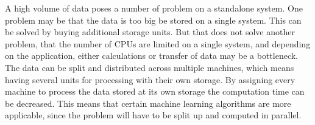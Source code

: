 A high volume of data poses a number of problem on a standalone system. One problem may be that the data is too big be stored on a single system.
This can be solved by buying additional storage units. But that does not solve another problem, that the number of CPUs are limited on a single system, and depending on the application, either calculations or transfer of data may be a bottleneck.
The data can be split and distributed across multiple machines, which means having several units for processing with their own storage. By assigning every machine to process the data stored at its own storage the computation time can be decreased.
This means that certain machine learning algorithms are more applicable, since the problem will have to be split up and computed in parallel. 

